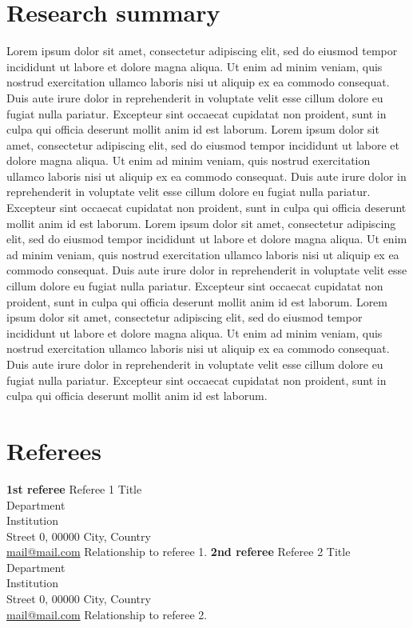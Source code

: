 \documentclass[a4paper,11pt,oneside]{article}
\begin{document}
\pagebreak

\section{Research summary}

Lorem ipsum dolor sit amet, consectetur adipiscing elit, sed do eiusmod tempor incididunt ut labore et dolore magna aliqua. Ut enim ad minim veniam, quis nostrud exercitation ullamco laboris nisi ut aliquip ex ea commodo consequat. Duis aute irure dolor in reprehenderit in voluptate velit esse cillum dolore eu fugiat nulla pariatur. Excepteur sint occaecat cupidatat non proident, sunt in culpa qui officia deserunt mollit anim id est laborum.
\bigbreak
Lorem ipsum dolor sit amet, consectetur adipiscing elit, sed do eiusmod tempor incididunt ut labore et dolore magna aliqua. Ut enim ad minim veniam, quis nostrud exercitation ullamco laboris nisi ut aliquip ex ea commodo consequat. Duis aute irure dolor in reprehenderit in voluptate velit esse cillum dolore eu fugiat nulla pariatur. Excepteur sint occaecat cupidatat non proident, sunt in culpa qui officia deserunt mollit anim id est laborum.
\bigbreak
Lorem ipsum dolor sit amet, consectetur adipiscing elit, sed do eiusmod tempor incididunt ut labore et dolore magna aliqua. Ut enim ad minim veniam, quis nostrud exercitation ullamco laboris nisi ut aliquip ex ea commodo consequat. Duis aute irure dolor in reprehenderit in voluptate velit esse cillum dolore eu fugiat nulla pariatur. Excepteur sint occaecat cupidatat non proident, sunt in culpa qui officia deserunt mollit anim id est laborum.
\bigbreak
Lorem ipsum dolor sit amet, consectetur adipiscing elit, sed do eiusmod tempor incididunt ut labore et dolore magna aliqua. Ut enim ad minim veniam, quis nostrud exercitation ullamco laboris nisi ut aliquip ex ea commodo consequat. Duis aute irure dolor in reprehenderit in voluptate velit esse cillum dolore eu fugiat nulla pariatur. Excepteur sint occaecat cupidatat non proident, sunt in culpa qui officia deserunt mollit anim id est laborum.

\pagebreak

\section{Referees}

\textbf{1st referee}
\bigbreak
Referee 1
\bigbreak
Title\\
Department\\
Institution\\
Street 0, 00000 City, Country\\
\href{mailto:mail@mail.com}{mail@mail.com}
\bigbreak
Relationship to referee 1.
\bigbreak
\textbf{2nd referee}
\bigbreak
Referee 2
\bigbreak
Title\\
Department\\
Institution\\
Street 0, 00000 City, Country\\
\href{mailto:mail@mail.com}{mail@mail.com}
\bigbreak
Relationship to referee 2.
\end{document}
